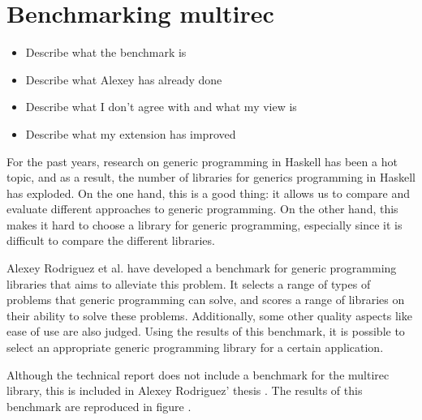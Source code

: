 \chapter{Benchmarking multirec}
\cite{benchmark}

\begin{itemize}
\item Describe what the benchmark is
\item Describe what Alexey has already done
\item Describe what I don't agree with and what my view is
\item Describe what my extension has improved
\end{itemize}

For the past years, research on generic programming in Haskell has
been a hot topic, and as a result, the number of libraries for
generics programming in Haskell has exploded. On the one hand, this
is a good thing: it allows us to compare and evaluate different
approaches to generic programming. On the other hand, this makes it
hard to choose a library for generic programming, especially since it
is difficult to compare the different libraries.

Alexey Rodriguez et al. \cite{benchmark} have developed a benchmark
for generic programming libraries that aims to alleviate this problem.
It selects a range of types of problems that generic programming can
solve, and scores a range of libraries on their ability to solve these
problems. Additionally, some other quality aspects like ease of use
are also judged. Using the results of this benchmark, it is possible
to select an appropriate generic programming library for a certain
application.

Although the technical report does not include a benchmark for the
multirec \cite{multirec} library, this is included in Alexey
Rodriguez' thesis \cite{thesis_alexey}. The results of this benchmark
are reproduced in figure .
